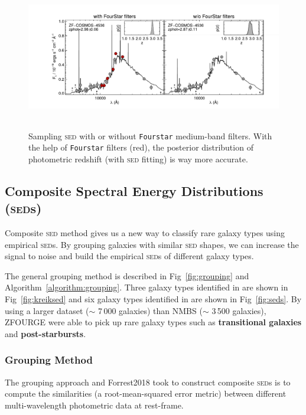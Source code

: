 \documentclass{ar-1col}
\begin{document}
\begin{figure}
    \includegraphics[width=6in, height=2.5in]{images/z_photo_better.pdf}
    \caption{Sampling \textsc{sed} with or without \texttt{Fourstar} medium-band filters. With the help of \texttt{Fourstar} filters (red), the posterior distribution of photometric redshift (with \textsc{sed} fitting) is way more accurate.}
    \label{fig:z_photo}
\end{figure}

\subsection{Composite Spectral Energy Distributions (\textsc{sed}s)}

Composite \textsc{sed} method gives us a new way to classify rare galaxy types using empirical \textsc{sed}s.
By grouping galaxies with similar \textsc{sed} shapes, we can increase the signal to noise and build the empirical \textsc{sed}s of different galaxy types.

The general grouping method is described in Fig~\ref{fig:grouping} and Algorithm~\ref{algorithm:grouping}. 
Three galaxy types identified in \citet{Kriek2011} are shown in Fig~\ref{fig:kreiksed} and six galaxy types identified in \citet{Forrest2018} are shown in Fig~\ref{fig:seds}. 
By using a larger dataset ($\sim$ 7\,000 galaxies) than NMBS ($\sim$ 3\,500 galaxies), ZFOURGE were able to pick up rare galaxy types such as \textbf{transitional galaxies} and \textbf{post-starbursts}.


\subsubsection{Grouping Method}
 
The grouping approach \citet{Kriek2011} and {Forrest2018} took to construct composite \textsc{sed}s is to compute the similarities (a root-mean-squared error metric) between different multi-wavelength photometric data at rest-frame.
\end{document}
